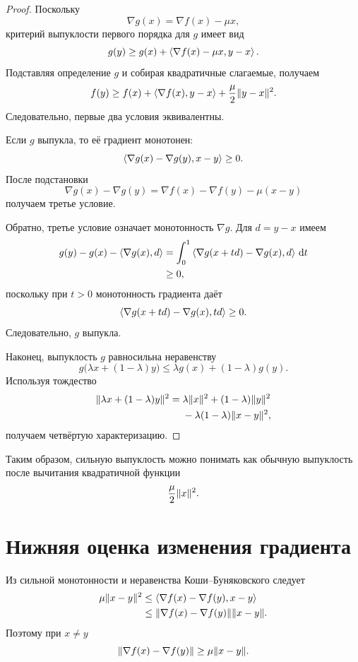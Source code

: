 \begin{proof}
Поскольку
\[
    \nabla g(x)=\nabla f(x)-\mu x,
\]
критерий выпуклости первого порядка для \(g\) имеет вид
\[
    g(y)
    \ge
    g(x)
    +
    \left\langle \nabla f(x)-\mu x,y-x \right\rangle.
\]
Подставляя определение \(g\) и собирая квадратичные слагаемые,
получаем
\[
    f(y)
    \ge
    f(x)
    +
    \left\langle \nabla f(x),y-x \right\rangle
    +
    \frac{\mu}{2}\lVert y-x\rVert^2.
\]
Следовательно, первые два условия эквивалентны.

Если \(g\) выпукла, то её градиент монотонен:
\[
    \left\langle \nabla g(x)-\nabla g(y),x-y \right\rangle\ge0.
\]
После подстановки
\[
    \nabla g(x)-\nabla g(y)
    =
    \nabla f(x)-\nabla f(y)-\mu(x-y)
\]
получаем третье условие.

Обратно, третье условие означает монотонность \(\nabla g\). Для
\(d=y-x\) имеем
\[
\begin{aligned}
    g(y)-g(x)-\left\langle \nabla g(x),d \right\rangle
    &=
    \int_0^1
    \left\langle 
        \nabla g(x+td)-\nabla g(x)
    ,d \right\rangle
    \,\mathrm dt
    \\
    &\ge0,
\end{aligned}
\]
поскольку при \(t>0\) монотонность градиента даёт
\[
    \left\langle 
        \nabla g(x+td)-\nabla g(x)
    ,td \right\rangle
    \ge0.
\]
Следовательно, \(g\) выпукла.

Наконец, выпуклость \(g\) равносильна неравенству
\[
    g\bigl(\lambda x+(1-\lambda)y\bigr)
    \le
    \lambda g(x)+(1-\lambda)g(y).
\]
Используя тождество
\[
\begin{aligned}
    \lVert\lambda x+(1-\lambda)y\rVert^2
    ={}&
    \lambda\lVert x\rVert^2+(1-\lambda)\lVert y\rVert^2
    \\
    &-
    \lambda(1-\lambda)\lVert x-y\rVert^2,
\end{aligned}
\]
получаем четвёртую характеризацию.
\end{proof}

Таким образом, сильную выпуклость можно понимать как обычную
выпуклость после вычитания квадратичной функции
\[
    \frac{\mu}{2}\lVert x\rVert^2.
\]

\section{Нижняя оценка изменения градиента}

Из сильной монотонности и неравенства Коши--Буняковского следует
\[
\begin{aligned}
    \mu\lVert x-y\rVert^2
    &\le
    \left\langle 
        \nabla f(x)-\nabla f(y)
    ,
        x-y
     \right\rangle
    \\
    &\le
    \lVert\nabla f(x)-\nabla f(y)\rVert
    \lVert x-y\rVert.
\end{aligned}
\]
Поэтому при \(x\ne y\)
\[
    \lVert\nabla f(x)-\nabla f(y)\rVert
    \ge
    \mu\lVert x-y\rVert.
\]

